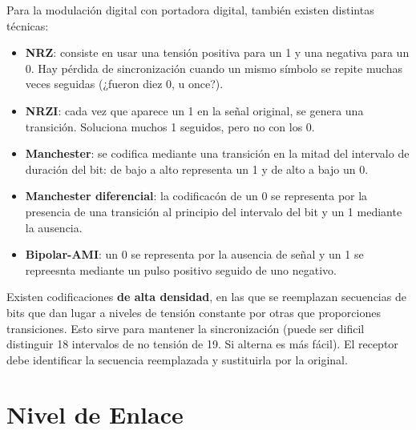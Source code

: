 \documentclass[]{article}
\begin{document}

Para la modulación digital con portadora digital, también existen distintas técnicas:
\begin{itemize}
    \item \textbf{NRZ}: consiste en usar una tensión positiva para un 1 y una negativa para un 0. Hay pérdida de sincronización cuando un mismo símbolo se repite muchas veces seguidas (¿fueron diez 0, u once?).
    \item \textbf{NRZI}: cada vez que aparece un 1 en la señal original, se genera una transición. Soluciona muchos 1 seguidos, pero no con los 0.
    \item \textbf{Manchester}: se codifica mediante una transición en la mitad del intervalo de duración del bit: de bajo a alto representa un 1 y de alto a bajo un 0.
    \item \textbf{Manchester diferencial}: la codificacón de un 0 se representa por la presencia de una transición al principio del intervalo del bit y un 1 mediante la ausencia.
    \item \textbf{Bipolar-AMI}: un 0 se representa por la ausencia de señal y un 1 se repreesnta mediante un pulso positivo seguido de uno negativo.
\end{itemize}

Existen codificaciones \textbf{de alta densidad}, en las que se reemplazan secuencias de bits que dan lugar a niveles de tensión constante por otras que proporciones transiciones. Esto sirve para mantener la sincronización (puede ser dificil distinguir 18 intervalos de no tensión de 19. Si alterna es más fácil). El receptor debe identificar la secuencia reemplazada y sustituirla por la original.





\section{Nivel de Enlace}
\end{document}
